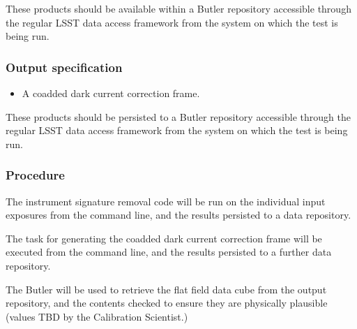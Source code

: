 These products should be available within a Butler repository accessible
through the regular LSST data access framework from the system on which the test
is being run.

\subsubsection{Output specification}

\begin{itemize}

  \item{A coadded dark current correction frame.}

\end{itemize}

These products should be persisted to a Butler repository accessible through
the regular LSST data access framework from the system on which the test is
being run.

\subsubsection{Procedure}

The instrument signature removal code will be run on the individual input
exposures from the command line, and the results persisted to a data
repository.

The task for generating the coadded dark current correction frame will be
executed from the command line, and the results persisted to a further data
repository.

The Butler will be used to retrieve the flat field data cube from the output
repository, and the contents checked to ensure they are physically plausible
(values TBD by the Calibration Scientist.)
